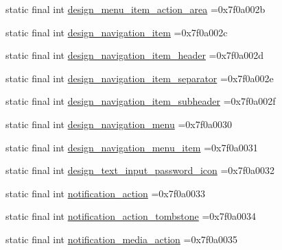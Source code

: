 \begin{DoxyCompactItemize}
\item 
static final int \mbox{\hyperlink{classcom_1_1example_1_1trainawearapplication_1_1_r_1_1layout_ae8940536f8e3fb12e4453bf817f0028f}{design\+\_\+menu\+\_\+item\+\_\+action\+\_\+area}} =0x7f0a002b
\item 
static final int \mbox{\hyperlink{classcom_1_1example_1_1trainawearapplication_1_1_r_1_1layout_a7d943031a6292b7babffebca1190b280}{design\+\_\+navigation\+\_\+item}} =0x7f0a002c
\item 
static final int \mbox{\hyperlink{classcom_1_1example_1_1trainawearapplication_1_1_r_1_1layout_a630f1e82a48e93d01f4cb495dcc9f2e5}{design\+\_\+navigation\+\_\+item\+\_\+header}} =0x7f0a002d
\item 
static final int \mbox{\hyperlink{classcom_1_1example_1_1trainawearapplication_1_1_r_1_1layout_a8e8fc3b188429106e89c1bdb9accc999}{design\+\_\+navigation\+\_\+item\+\_\+separator}} =0x7f0a002e
\item 
static final int \mbox{\hyperlink{classcom_1_1example_1_1trainawearapplication_1_1_r_1_1layout_accac7b5ff3e8df191dc653aba1d47866}{design\+\_\+navigation\+\_\+item\+\_\+subheader}} =0x7f0a002f
\item 
static final int \mbox{\hyperlink{classcom_1_1example_1_1trainawearapplication_1_1_r_1_1layout_ae24fc91144fcf0ad0c5789142b4e0545}{design\+\_\+navigation\+\_\+menu}} =0x7f0a0030
\item 
static final int \mbox{\hyperlink{classcom_1_1example_1_1trainawearapplication_1_1_r_1_1layout_a0181d448f8017036ff5d8f5a6a9391db}{design\+\_\+navigation\+\_\+menu\+\_\+item}} =0x7f0a0031
\item 
static final int \mbox{\hyperlink{classcom_1_1example_1_1trainawearapplication_1_1_r_1_1layout_a1d33b50ac72482089ee7d68fd27f4fa8}{design\+\_\+text\+\_\+input\+\_\+password\+\_\+icon}} =0x7f0a0032
\item 
static final int \mbox{\hyperlink{classcom_1_1example_1_1trainawearapplication_1_1_r_1_1layout_a7b91149cb9ebf8f0132deebc12cae6d9}{notification\+\_\+action}} =0x7f0a0033
\item 
static final int \mbox{\hyperlink{classcom_1_1example_1_1trainawearapplication_1_1_r_1_1layout_a3b3be9269ba20d917a741d1971b86757}{notification\+\_\+action\+\_\+tombstone}} =0x7f0a0034
\item 
static final int \mbox{\hyperlink{classcom_1_1example_1_1trainawearapplication_1_1_r_1_1layout_af2b69a79bc1943036cf5fed0cb403926}{notification\+\_\+media\+\_\+action}} =0x7f0a0035
\item 

\end{DoxyCompactItemize}

